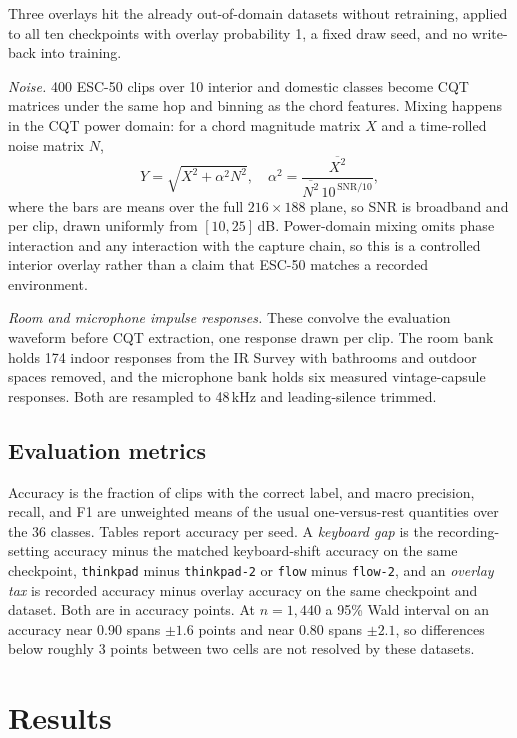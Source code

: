 \documentclass[pdflatex,sn-mathphys-num,iicol]{sn-jnl}
\begin{document}
Three overlays hit the already out-of-domain datasets without retraining, applied to all ten checkpoints with overlay probability 1, a fixed draw seed, and no write-back into training.

\emph{Noise.} 400 ESC-50 clips over 10 interior and domestic classes \cite{Piczak2015} become CQT matrices under the same hop and binning as the chord features. Mixing happens in the CQT power domain: for a chord magnitude matrix $X$ and a time-rolled noise matrix $N$,
\begin{equation}
Y = \sqrt{X^{2} + \alpha^{2} N^{2}}, \quad
\alpha^{2} = \frac{\overline{X^{2}}}{\overline{N^{2}}\,10^{\,\mathrm{SNR}/10}} ,
\label{eq_mix}
\end{equation}
where the bars are means over the full $216\times188$ plane, so SNR is broadband and per clip, drawn uniformly from $[10,25]$\,dB. Power-domain mixing omits phase interaction and any interaction with the capture chain, so this is a controlled interior overlay rather than a claim that ESC-50 matches a recorded environment.

\emph{Room and microphone impulse responses.} These convolve the evaluation waveform before CQT extraction, one response drawn per clip. The room bank holds 174 indoor responses from the IR Survey \cite{Traer2016} with bathrooms and outdoor spaces removed, and the microphone bank holds six measured vintage-capsule responses. Both are resampled to 48\,kHz and leading-silence trimmed.

\subsection{Evaluation metrics}\label{subsec_metrics}

Accuracy is the fraction of clips with the correct label, and macro precision, recall, and F1 are unweighted means of the usual one-versus-rest quantities over the 36 classes. Tables report accuracy per seed. A \emph{keyboard gap} is the recording-setting accuracy minus the matched keyboard-shift accuracy on the same checkpoint, \texttt{thinkpad} minus \texttt{thinkpad-2} or \texttt{flow} minus \texttt{flow-2}, and an \emph{overlay tax} is recorded accuracy minus overlay accuracy on the same checkpoint and dataset. Both are in accuracy points. At $n=1{,}440$ a 95\% Wald interval on an accuracy near 0.90 spans $\pm1.6$ points and near 0.80 spans $\pm2.1$, so differences below roughly 3 points between two cells are not resolved by these datasets.

\section{Results}\label{sec_results}
\end{document}

